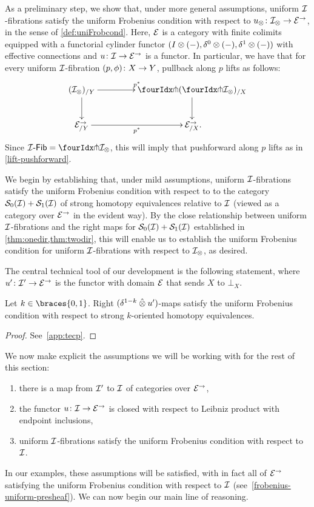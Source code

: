 \documentclass[reqno,10pt,a4paper,oneside,draft]{amsart}
\begin{document}
As a preliminary step, we show that, under more general assumptions, uniform $\cal{I}$-fibrations satisfy the uniform Frobenius condition with respect to $u_\otimes \co \cal{I}_\otimes \to \cal{E}^\to$, in the sense of \cref{def:uniFrobcond}.
Here, $\catE$ is a category with finite colimits equipped with a functorial cylinder functor $(\interval \otimes (-), \lcyl \otimes (-), \rcyl \otimes (-))$ with effective connections and $u \co \cal{I} \to \catE^\to$ is a functor.
In particular, we have that for every uniform $\cal{I}$-fibration $(p, \phi) \co X \to Y$, pullback along $p$ lifts as follows:
\[
\xymatrix@C+2em{
  (\cal{I}_\otimes)_{/Y}
  \ar[r]^{p^*}
  \ar[d]
&
  \liftl{(\liftr{\cal{I}_\otimes})}_{/X}
  \ar[d]
\\
  \cal{E}^\to_{/Y}
  \ar[r]_{p^*}
&
  \cal{E}^\to_{/X}
\rlap{.}}
\]
Since $\Fib{\cal{I}}  = \liftr{\cal{I}_\otimes}$, this will imply that pushforward along $p$ lifts as in \cref{lift-pushforward}.

We begin by establishing that, under mild assumptions, uniform $\cal{I}$-fibrations satisfy the uniform Frobenius condition with respect to to the category $\cal{S}_0(\cal{I}) + \cal{S}_1(\cal{I})$ of strong homotopy equivalences relative to $\cal{I}$ (viewed as a category over $\cal{E}^\to$ in the evident way).
By the close relationship between uniform $\cal{I}$-fibrations and the right maps for $\cal{S}_0(\cal{I}) + \cal{S}_1(\cal{I})$ established in \cref{thm:onedir,thm:twodir}, this will enable us to establish the uniform Frobenius condition for uniform $\cal{I}$-fibrations with respect to $\cal{I}_\otimes$, as desired.

The central technical tool of our development is the following statement, where $u' \co \cal{I}' \to \cal{E}^\to$ is the functor with domain $\cal{E}$ that sends $X$ to $\bot_X$.

\begin{lemma} \label{technical}
Let $k \in \braces{0, 1}$.
Right $(\delta^{1-k} \hatotimes u')$-maps satisfy the uniform Frobenius condition with respect to strong $k$-oriented homotopy equivalences.
\end{lemma}

\begin{proof}
See~\cref{app:tecp}.
\end{proof}

We now make explicit the assumptions we will be working with for the rest of this section:
\begin{enumerate}[(1)]
\item
there is a map from $\cal{I}'$ to $\cal{I}$ of categories over $\cal{E}^\to$,
\item
the functor $u \co \cal{I} \to \catE^\to$ is closed with respect to Leibniz product with endpoint inclusions,
\item
uniform $\cal{I}$-fibrations satisfy the uniform Frobenius condition with respect to $\cal{I}$.
\end{enumerate}
In our examples, these assumptions will be satisfied, with in fact all of $\catE^\to$ satisfying the uniform Frobenius condition with respect to $\cal{I}$ (see~\cref{frobenius-uniform-presheaf}).
We can now begin our main line of reasoning.
\end{document}
